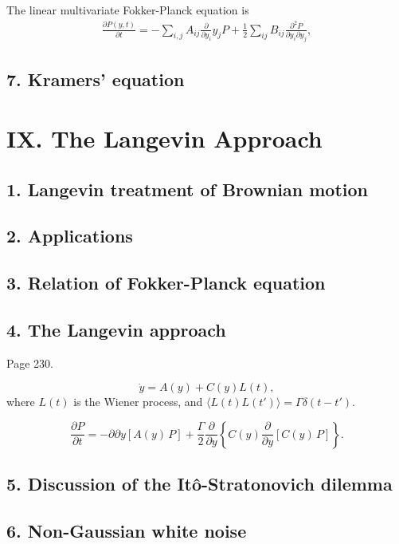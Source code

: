 \documentclass{book}
\begin{document}
The linear multivariate Fokker-Planck equation is
\begin{align}
\frac{  \partial P(y, t) } { \partial t }
=
-\sum_{i,j} A_{ij} \frac{ \partial } { \partial y_i } y_j P
+ \frac 1 2 \sum_{ij} B_{ij} \frac{ \partial^2 P } { \partial y_i \partial y_j },
\tag{6.4}
\end{align}

\section{7. Kramers' equation}

\chapter{IX. The Langevin Approach}

\section{1. Langevin treatment of Brownian motion}

\section{2. Applications}

\section{3. Relation of Fokker-Planck equation}

\section{4. The Langevin approach}

Page 230.

$$
\dot y = A(y) + C(y) L(t),
$$
where $L(t)$ is the Wiener process,
and $\langle L(t) L(t') \rangle = \Gamma \delta(t - t')$.


$$
\frac{ \partial P }{ \partial t }
=
-{ \partial } { \partial y } [ A(y) \, P ]
+
\frac{ \Gamma } { 2 } \frac{ \partial } { \partial y }
\left\{
  C(y)
  \frac{ \partial } { \partial y } [ C(y) \, P ]
\right\}.
$$

\section{5. Discussion of the It\^o-Stratonovich dilemma}

\section{6. Non-Gaussian white noise}
\end{document}

